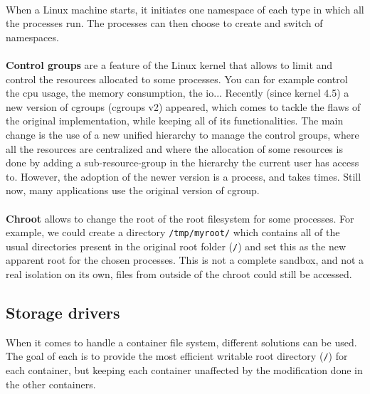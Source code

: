 \paragraph{}When a Linux machine starts, it initiates one namespace of each type in which all the processes run.  The processes can then choose to create and switch of namespaces.

\paragraph{}\textbf{Control groups} are a feature of the Linux kernel that allows to limit and control the resources allocated to some processes.  You can for example control the cpu usage, the memory consumption, the io...  Recently (since kernel 4.5) a new version of cgroups (cgroups v2) appeared, which comes to tackle the flaws of the original implementation, while keeping all of its functionalities.  The main change is the use of a new unified hierarchy to manage the control groups, where all the resources are centralized and where the allocation of some resources is done by adding a sub-resource-group in the hierarchy the current user has access to.
However, the adoption of the newer version is a process, and takes times. Still now, many applications use the original version of cgroup.

\paragraph{}\textbf{Chroot} allows to change the root of the root filesystem for some processes.  For example, we could create a directory \texttt{/tmp/myroot/} which contains all of the usual directories present in the original root folder (\texttt{/}) and set this as the new apparent root for the chosen processes.  This is not a complete sandbox, and not a real isolation on its own, files from outside of the chroot could still be accessed.

\subsection{Storage drivers}
When it comes to handle a container file system, different solutions can be used.  The goal of each is to provide the most efficient writable root directory (\texttt{/}) for each container, but keeping each container unaffected by the modification done in the other containers.


